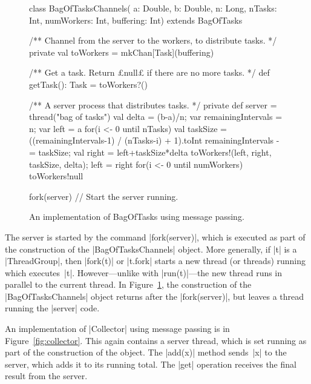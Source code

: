 \begin{figure}
\begin{scala}
class BagOfTasksChannels(
  a: Double, b: Double, n: Long, nTasks: Int, numWorkers: Int, buffering: Int)
    extends BagOfTasks{
  /** Channel from the server to the workers, to distribute tasks. */
  private val toWorkers = mkChan[Task](buffering)

  /** Get a task.  Return £null£ if there are no more tasks. */
  def getTask(): Task = toWorkers?() 

  /** A server process that distributes tasks. */
  private def server = thread("bag of tasks"){
    val delta = (b-a)/n; var remainingIntervals = n; var left = a
    for(i <- 0 until nTasks){
      val taskSize = ((remainingIntervals-1) / (nTasks-i) + 1).toInt
      remainingIntervals -= taskSize; val right = left+taskSize*delta
      toWorkers!(left, right, taskSize, delta); left = right
    }
    for(i <- 0 until numWorkers) toWorkers!null
  }

  fork(server)  // Start the server running.
}
\end{scala}
\caption{An implementation of {\scalashape BagOfTasks} using message passing.}
\label{fig:bagOfTasksObject}
\end{figure}


The server is started by the command |fork(server)|, which is executed as part
of the construction of the |BagOfTasksChannels| object.
%
More generally, if |t| is a |ThreadGroup|, then |fork(t)| or |t.fork| starts a
new thread (or threads) running which executes~|t|.  However---unlike with
|run(t)|---the new thread runs in parallel to the current thread.  In
Figure~\ref{fig:bagOfTasksObject}, the construction of the
|BagOfTasksChannels| object returns after the |fork(server)|, but leaves a
thread running the |server| code.


An implementation of |Collector| using message passing is in
Figure~\ref{fig:collector}.  This again contains a server thread, which is set
running as part of the construction of the object.  The |add(x)| method
sends~|x| to the server, which adds it to its running total.  The |get|
operation receives the final result from the server.


